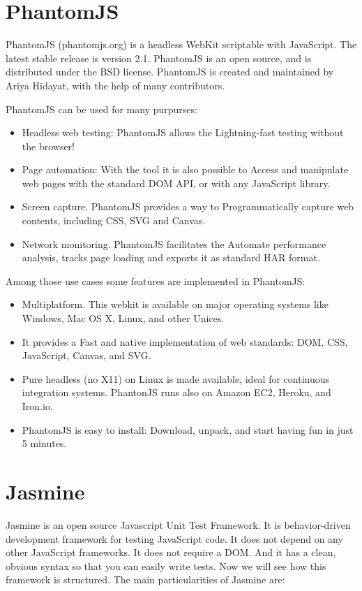 \documentclass[11pt]{article}
\begin{document}
\section{PhantomJS}

PhantomJS (phantomjs.org) is a headless WebKit scriptable with JavaScript. The latest stable release is version 2.1. PhantomJS is an open source, and is distributed under the BSD license. PhantomJS is created and maintained by Ariya Hidayat, with the help of many contributors.

PhantomJS can be used for many purpurses:

\begin{itemize}
\item Headless web testing: PhantomJS allows the Lightning-fast testing without the browser!
\item Page automation: With the tool it is also possible to Access and manipulate web pages with the standard DOM API, or with any JavaScript library.
\item Screen capture. PhantomJS provides a way to Programmatically capture web contents, including CSS, SVG and Canvas.
\item Network monitoring. PhantomJS facilitates the Automate performance analysis, tracks page loading and exports it as standard HAR format.
\end{itemize}

Among those use cases some features are implemented in PhantomJS:

\begin{itemize}
\item Multiplatform. This webkit is available on major operating systems like Windows, Mac OS X, Linux, and other Unices.
\item It provides a Fast and native implementation of web standards: DOM, CSS, JavaScript, Canvas, and SVG.
\item Pure headless (no X11) on Linux is made available, ideal for continuous integration systems. PhantonJS runs also on Amazon EC2, Heroku, and Iron.io.
\item PhantomJS is easy to install: Download, unpack, and start having fun in just 5 minutes.
\end{itemize}

\section{Jasmine}

Jasmine is an open source Javascript Unit Test Framework. It is behavior-driven development framework for testing JavaScript code. It does not depend on any other JavaScript frameworks. It does not require a DOM. And it has a clean, obvious syntax so that you can easily write tests. Now we will see how this framework is structured. The main particularities of Jasmine are:
\end{document}
